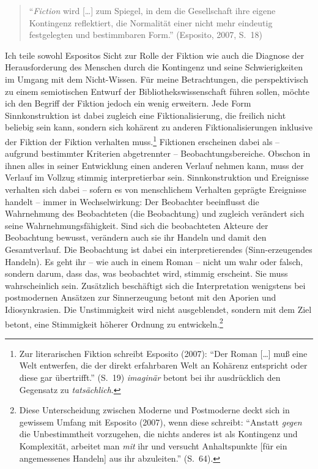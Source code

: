 \documentclass[output=paper]{langscibook}
\begin{document}
\begin{quote}
\enquote{\emph{Fiction} wird {[}\ldots{]} zum Spiegel, in dem die
Gesellschaft ihre eigene Kontingenz reflektiert, die Normalität einer
nicht mehr eindeutig festgelegten und bestimmbaren Form.} (Esposito,
2007, S.~18)
\end{quote}

\noindent Ich teile sowohl Espositos Sicht zur Rolle der Fiktion wie auch die
Diagnose der Herausforderung des Menschen durch die Kontingenz und seine
Schwierigkeiten im Umgang mit dem Nicht-Wissen. Für meine Betrachtungen,
die perspektivisch zu einem semiotischen Entwurf der
Bibliothekswissenschaft führen sollen, möchte ich den Begriff der
Fiktion jedoch ein wenig erweitern. Jede Form Sinnkonstruktion ist dabei
zugleich eine Fiktionalisierung, die freilich nicht beliebig sein kann,
sondern sich kohärent zu anderen Fiktionalisierungen inklusive der
Fiktion der Fiktion verhalten muss.\footnote{Zur literarischen Fiktion
  schreibt Esposito (2007): \enquote{Der Roman {[}\ldots{]} muß eine
  Welt entwerfen, die der direkt erfahrbaren Welt an Kohärenz entspricht
  oder diese gar übertrifft.} (S.~19) \emph{imaginär} betont bei ihr
  ausdrücklich den Gegensatz zu \emph{tatsächlich}.} Fiktionen
erscheinen dabei als -- aufgrund bestimmter Kriterien abgetrennter --
Beobachtungsbereiche. Obschon in ihnen alles in seiner Entwicklung einen
anderen Verlauf nehmen kann, muss der Verlauf im Vollzug stimmig
interpretierbar sein. Sinnkonstruktion und Ereignisse verhalten sich
dabei -- sofern es von menschlichem Verhalten geprägte Ereignisse
handelt -- immer in Wechselwirkung: Der Beobachter beeinflusst die
Wahrnehmung des Beobachteten (die Beobachtung) und zugleich verändert
sich seine Wahrnehmungsfähigkeit. Sind sich die beobachteten Akteure der
Beobachtung bewusst, verändern auch sie ihr Handeln und damit den
Gesamtverlauf. Die Beobachtung ist dabei ein interpretierendes
(Sinn-erzeugendes Handeln). Es geht ihr -- wie auch in einem Roman --
nicht um wahr oder falsch, sondern darum, dass das, was beobachtet wird,
stimmig erscheint. Sie muss wahrscheinlich sein. Zusätzlich beschäftigt
sich die Interpretation wenigstens bei postmodernen Ansätzen zur
Sinnerzeugung betont mit den Aporien und Idiosynkrasien. Die
Unstimmigkeit wird nicht ausgeblendet, sondern mit dem Ziel betont, eine
Stimmigkeit höherer Ordnung zu entwickeln.\footnote{Diese Unterscheidung
  zwischen Moderne und Postmoderne deckt sich in gewissem Umfang mit
  Esposito (2007), wenn diese schreibt: \enquote{Anstatt \emph{gegen}
  die Unbestimmtheit vorzugehen, die nichts anderes ist als Kontingenz
  und Komplexität, arbeitet man \emph{mit} ihr und versucht
  Anhaltspunkte {[}für ein angemessenes Handeln{]} aus ihr abzuleiten.}
  (S.~64).}
\end{document}
